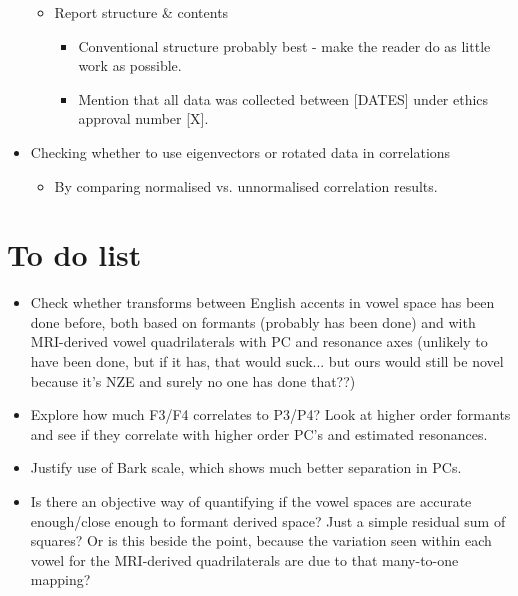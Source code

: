 \documentclass{article}
\begin{document}
\begin{itemize}
\begin{itemize}
\begin{itemize}
        \end{itemize}
        \item Report structure \& contents
        \begin{itemize}
            \item Conventional structure probably best - make the reader do as little work as possible.
            \item Mention that all data was collected between [DATES] under ethics approval number [X].
        \end{itemize}
    \end{itemize}
    \item Checking whether to use eigenvectors or rotated data in correlations
    \begin{itemize}
        \item By comparing normalised vs. unnormalised correlation results.
    \end{itemize}
\end{itemize}

\section*{To do list}
\begin{itemize}
    \item Check whether transforms between English accents in vowel space has been done before, both based on formants (probably has been done) and with MRI-derived vowel quadrilaterals with PC and resonance axes (unlikely to have been done, but if it has, that would suck... but ours would still be novel because it's NZE and surely no one has done that??)
    \item Explore how much F3/F4 correlates to P3/P4? Look at higher order formants and see if they correlate with higher order PC's and estimated resonances.
    \item Justify use of Bark scale, which shows much better separation in PCs.
    \item Is there an objective way of quantifying if the vowel spaces are accurate enough/close enough to formant derived space? Just a simple residual sum of squares? Or is this beside the point, because the variation seen within each vowel for the MRI-derived quadrilaterals are due to that many-to-one mapping?
\end{itemize}
\end{document}
